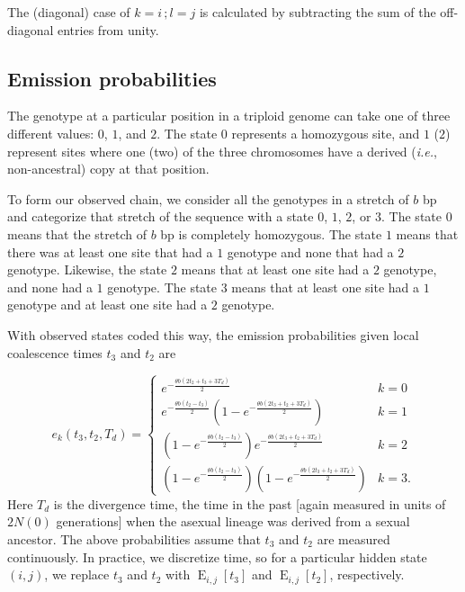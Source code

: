 \documentclass{article}
\DeclareMathOperator{\E}{E}
\begin{document}
The (diagonal) case of $k=i\,;l=j$ is calculated by subtracting the sum of the
off-diagonal entries from unity.

\subsection{Emission probabilities}

The genotype at a particular position in a triploid genome can take one of
three different values: $0$, $1$, and $2$. The state $0$ represents a
homozygous site, and $1$ ($2$) represent sites where one (two) of the three
chromosomes have a derived (\emph{i.e.}, non-ancestral) copy at that position.

To form our observed chain, we consider all the genotypes in a stretch of $b$
bp and categorize that stretch of the sequence with a state $0$, $1$, $2$, or
$3$. The state $0$ means that the stretch of $b$ bp is completely homozygous.
The state $1$ means that there was at least one site that had a $1$ genotype
and none that had a $2$ genotype. Likewise, the state $2$ means that at least
one site had a $2$ genotype, and none had a $1$ genotype. The state $3$ means
that at least one site had a $1$ genotype and at least one site had a $2$
genotype.

With observed states coded this way, the emission probabilities given local
coalescence times $t_3$ and $t_2$ are

\begin{equation}
    e_k(t_3,t_2, T_d) =
    \begin{cases}
        e^{-\frac{\theta b \left(2t_2+t_3+3T_d\right)}{2}}&k=0\\
        e^{-\frac{\theta b \left(t_2-t_3\right)}{2}}\left(1-e^{-\frac{\theta b \left(2t_3+t_2+3T_d\right)}{2}}\right)&k=1\\
        \left(1-e^{-\frac{\theta b \left(t_2-t_3\right)}{2}}\right)e^{-\frac{\theta b \left(2t_3+t_2+3T_d\right)}{2}}&k=2\\
        \left(1-e^{-\frac{\theta b \left(t_2-t_3\right)}{2}}\right)\left(1-e^{-\frac{\theta b \left(2t_3+t_2+3T_d\right)}{2}}\right)&k=3.
    \end{cases}
    \label{eq:emissionprobs}
\end{equation}
Here $T_d$ is the divergence time, the time in the past [again measured in
units of $2N(0)$ generations] when the asexual lineage was derived from a
sexual ancestor. The above probabilities assume that $t_3$ and $t_2$ are
measured continuously. In practice, we discretize time, so for a particular
hidden state $(i,j)$, we replace $t_3$ and $t_2$ with $\E_{i,j}[t_3]$ and
$\E_{i,j}[t_2]$, respectively.
\end{document}
